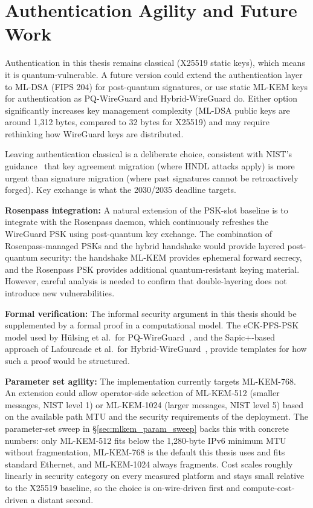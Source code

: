 \section{Authentication Agility and Future Work}

Authentication in this thesis remains classical (X25519 static keys), which means it is quantum-vulnerable. A future version could extend the authentication layer to ML-DSA (FIPS 204) for post-quantum signatures, or use static ML-KEM keys for authentication as PQ-WireGuard and Hybrid-WireGuard do. Either option significantly increases key management complexity (ML-DSA public keys are around 1,312 bytes, compared to 32 bytes for X25519) and may require rethinking how WireGuard keys are distributed.

Leaving authentication classical is a deliberate choice, consistent with NIST's guidance~\cite{nistir8547} that key agreement migration (where HNDL attacks apply) is more urgent than signature migration (where past signatures cannot be retroactively forged). Key exchange is what the 2030/2035 deadline targets.

\textbf{Rosenpass integration:} A natural extension of the PSK-slot baseline is to integrate with the Rosenpass daemon, which continuously refreshes the WireGuard PSK using post-quantum key exchange. The combination of Rosenpass-managed PSKs and the hybrid handshake would provide layered post-quantum security: the handshake ML-KEM provides ephemeral forward secrecy, and the Rosenpass PSK provides additional quantum-resistant keying material. However, careful analysis is needed to confirm that double-layering does not introduce new vulnerabilities.

\textbf{Formal verification:} The informal security argument in this thesis should be supplemented by a formal proof in a computational model. The eCK-PFS-PSK model used by Hülsing et al.\ for PQ-WireGuard~\cite{hulsing2021pqwireguard}, and the Sapic+-based approach of Lafourcade et al.\ for Hybrid-WireGuard~\cite{lafourcade2025hybrid}, provide templates for how such a proof would be structured.

\textbf{Parameter set agility:} The implementation currently targets ML-KEM-768. An extension could allow operator-side selection of ML-KEM-512 (smaller messages, NIST level 1) or ML-KEM-1024 (larger messages, NIST level 5) based on the available path MTU and the security requirements of the deployment. The parameter-set sweep in \S\ref{sec:mlkem_param_sweep} backs this with concrete numbers: only ML-KEM-512 fits below the 1{,}280-byte IPv6 minimum MTU without fragmentation, ML-KEM-768 is the default this thesis uses and fits standard Ethernet, and ML-KEM-1024 always fragments. Cost scales roughly linearly in security category on every measured platform and stays small relative to the X25519 baseline, so the choice is on-wire-driven first and compute-cost-driven a distant second.

